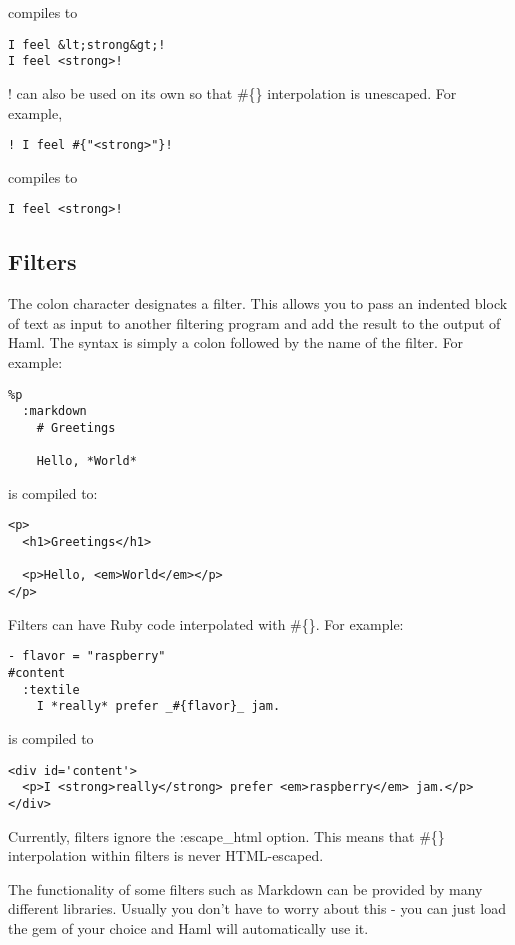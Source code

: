 \documentclass[10pt]{article}
\begin{document}
 compiles to
\begin{verbatim}
I feel &lt;strong&gt;!
I feel <strong>!
\end{verbatim}


 ! can also be used on its own so that \#\{\} interpolation is unescaped. For example,
\begin{verbatim}
! I feel #{"<strong>"}!
\end{verbatim}


 compiles to
\begin{verbatim}
I feel <strong>!
\end{verbatim}
\subsection*{Filters}


 The colon character designates a filter. This allows you to pass an indented block of text as input to another filtering program and add the result to the output of Haml. The syntax is simply a colon followed by the name of the filter. For example:
\begin{verbatim}
%p
  :markdown
    # Greetings

    Hello, *World*
\end{verbatim}


 is compiled to:
\begin{verbatim}
<p>
  <h1>Greetings</h1>

  <p>Hello, <em>World</em></p>
</p>
\end{verbatim}


 Filters can have Ruby code interpolated with \#\{\}. For example:
\begin{verbatim}
- flavor = "raspberry"
#content
  :textile
    I *really* prefer _#{flavor}_ jam.
\end{verbatim}


 is compiled to
\begin{verbatim}
<div id='content'>
  <p>I <strong>really</strong> prefer <em>raspberry</em> jam.</p>
</div>
\end{verbatim}


 Currently, filters ignore the :escape\_html option. This means that \#\{\} interpolation within filters is never HTML-escaped.


 The functionality of some filters such as Markdown can be provided by many different libraries. Usually you don’t have to worry about this - you can just load the gem of your choice and Haml will automatically use it.
\end{document}
